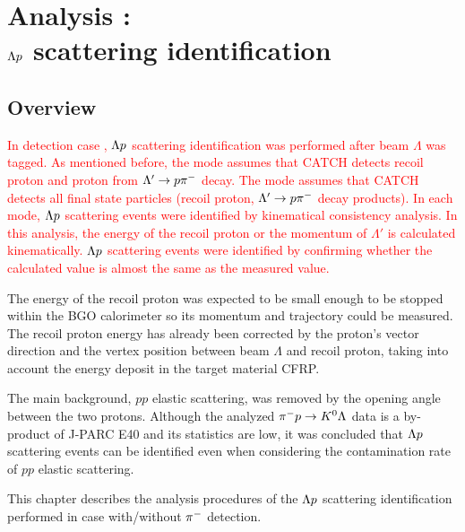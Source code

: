 %

\graphicspath{{./pictures/chapter_Lp_2p}}

\chapter{Analysis : \\$\Lambda p$ scattering identification} 
\label{chap-Lp_2p}

\section{Overview}
\textcolor{red}{ In detection case , $\Lambda p$ scattering identification was performed after beam $\Lambda$ was tagged. As mentioned before, the  mode assumes that CATCH detects recoil proton and proton from $\Lambda'\to p\pi^{-}$ decay. The  mode assumes that CATCH detects all final state particles (recoil proton, $\Lambda'\to p\pi^{-}$ decay products). In each mode, $\Lambda p$ scattering events were identified by kinematical consistency analysis. In this analysis, the energy of the recoil proton or the momentum of $\Lambda'$ is calculated kinematically. $\Lambda p$ scattering events were identified by confirming whether the calculated value is almost the same as the measured value. }

The energy of the recoil proton was expected to be small enough to be stopped within the BGO calorimeter so its momentum and trajectory could be measured. The recoil proton energy has already been corrected by the proton's vector direction and the vertex position between beam $\Lambda$ and recoil proton, taking into account the energy deposit in the target material CFRP.

The main background, $pp$ elastic scattering, was removed by the opening angle between the two protons. Although the analyzed $\pi^- p \to K^0 \Lambda$ data is a by-product of J-PARC E40 and its statistics are low, it was concluded that $\Lambda p$ scattering events can be identified even when considering the contamination rate of $pp$ elastic scattering.

This chapter describes the analysis procedures of the $\Lambda p$ scattering identification performed in case  with/without $\pi^{-}$ detection.



